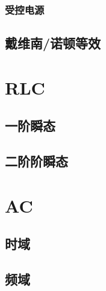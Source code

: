 \subsubsection{受控电源}

\subsection{戴维南/诺顿等效}

\section{RLC}

\subsection{一阶瞬态}

\subsection{二阶阶瞬态}

\section{AC}

\subsection{时域}

\subsection{频域}
